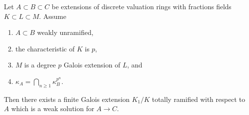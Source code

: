 \begin{lemma}
\label{lemma-characteristic-p-case}
Let $A \subset B \subset C$ be extensions of discrete valuation rings
with fractions fields $K \subset L \subset M$. Assume
\begin{enumerate}
\item $A \subset B$ weakly unramified,
\item the characteristic of $K$ is $p$,
\item $M$ is a degree $p$ Galois extension of $L$, and
\item $\kappa_A = \bigcap_{n \geq 1} \kappa_B^{p^n}$.
\end{enumerate}
Then there exists a finite Galois extension $K_1/K$
totally ramified with respect to $A$
which is a weak solution for $A \to C$.
\end{lemma}

